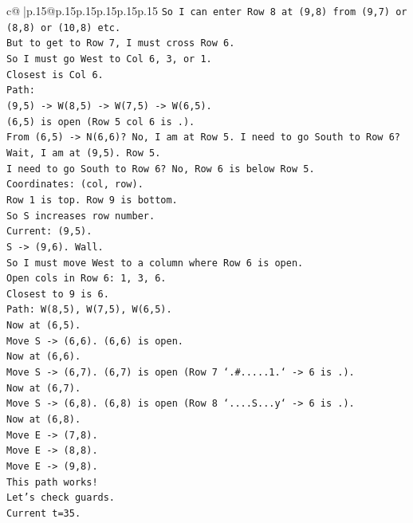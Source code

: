 \documentclass{article}
\begin{document}
{\begin{supertabular}{c@{$\;$}|p{.15\linewidth}@{}p{.15\linewidth}p{.15\linewidth}p{.15\linewidth}p{.15\linewidth}p{.15\linewidth}}
{{{\texttt{So I can enter Row 8 at (9,8) from (9,7) or (8,8) or (10,8) etc.} \\
\texttt{But to get to Row 7, I must cross Row 6.} \\
\texttt{So I must go West to Col 6, 3, or 1.} \\
\texttt{Closest is Col 6.} \\
\texttt{Path:} \\
\texttt{(9,5) {-}> W(8,5) {-}> W(7,5) {-}> W(6,5).} \\
\texttt{(6,5) is open (Row 5 col 6 is .).} \\
\texttt{From (6,5) {-}> N(6,6)? No, I am at Row 5. I need to go South to Row 6?} \\
\texttt{Wait, I am at (9,5). Row 5.} \\
\texttt{I need to go South to Row 6? No, Row 6 is below Row 5.} \\
\texttt{Coordinates: (col, row).} \\
\texttt{Row 1 is top. Row 9 is bottom.} \\
\texttt{So S increases row number.} \\
\texttt{Current: (9,5).} \\
\texttt{S {-}> (9,6). Wall.} \\
\texttt{So I must move West to a column where Row 6 is open.} \\
\texttt{Open cols in Row 6: 1, 3, 6.} \\
\texttt{Closest to 9 is 6.} \\
\texttt{Path: W(8,5), W(7,5), W(6,5).} \\
\texttt{Now at (6,5).} \\
\texttt{Move S {-}> (6,6). (6,6) is open.} \\
\texttt{Now at (6,6).} \\
\texttt{Move S {-}> (6,7). (6,7) is open (Row 7 `.\#.....1.` {-}> 6 is .).} \\
\texttt{Now at (6,7).} \\
\texttt{Move S {-}> (6,8). (6,8) is open (Row 8 `....S...y` {-}> 6 is .).} \\
\texttt{Now at (6,8).} \\
\texttt{Move E {-}> (7,8).} \\
\texttt{Move E {-}> (8,8).} \\
\texttt{Move E {-}> (9,8).} \\
\texttt{This path works!} \\
\texttt{Let's check guards.} \\
\texttt{Current t=35.} \\
}}}
\end{supertabular}}
\end{document}
